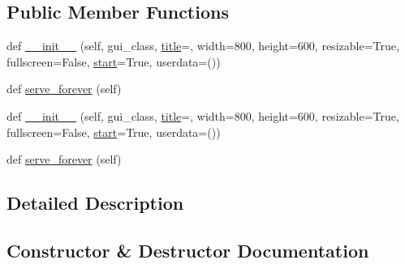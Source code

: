 \subsection*{Public Member Functions}
\begin{DoxyCompactItemize}
\item 
def \hyperlink{classremi_1_1server_1_1StandaloneServer_af72162c9b8c8c35288167d2b127204d5}{\+\_\+\+\_\+init\+\_\+\+\_\+} (self, gui\+\_\+class, \hyperlink{classremi_1_1server_1_1Server_a2e53f38dc0ced2c472d662d7dce195da}{title}=\textquotesingle{}\textquotesingle{}, width=800, height=600, resizable=True, fullscreen=False, \hyperlink{classremi_1_1server_1_1Server_a442c9f9b26e9c9bd5049461a25a21430}{start}=True, userdata=())
\item 
def \hyperlink{classremi_1_1server_1_1StandaloneServer_ac8642e4eb52ce29ac54739e0072e16b1}{serve\+\_\+forever} (self)
\item 
def \hyperlink{classremi_1_1server_1_1StandaloneServer_af72162c9b8c8c35288167d2b127204d5}{\+\_\+\+\_\+init\+\_\+\+\_\+} (self, gui\+\_\+class, \hyperlink{classremi_1_1server_1_1Server_a2e53f38dc0ced2c472d662d7dce195da}{title}=\textquotesingle{}\textquotesingle{}, width=800, height=600, resizable=True, fullscreen=False, \hyperlink{classremi_1_1server_1_1Server_a442c9f9b26e9c9bd5049461a25a21430}{start}=True, userdata=())
\item 
def \hyperlink{classremi_1_1server_1_1StandaloneServer_ac8642e4eb52ce29ac54739e0072e16b1}{serve\+\_\+forever} (self)
\end{DoxyCompactItemize}


\subsection{Detailed Description}
\begin{DoxyVerb}\end{DoxyVerb}
 

\subsection{Constructor \& Destructor Documentation}
